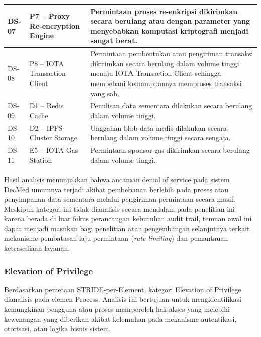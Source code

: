 \begin{xltabular}{\textwidth}{|>{\centering\arraybackslash}p{1.8cm}|>{\raggedright\arraybackslash}p{3.2cm}|X|}
    DS-07 &
    P7 -- Proxy Re-encryption Engine &
    Permintaan proses re-enkripsi dikirimkan secara berulang atau dengan parameter yang menyebabkan komputasi kriptografi menjadi sangat berat. \\
    \hline

    DS-08 &
    P8 -- IOTA Transaction Client &
    Permintaan pembentukan atau pengiriman transaksi dikirimkan secara berulang dalam volume tinggi menuju IOTA Transaction Client sehingga membebani kemampuannya memproses transaksi yang sah. \\
    \hline

    DS-09 &
    D1 -- Redis Cache &
    Penulisan data sementara dilakukan secara berulang dalam volume tinggi. \\
    \hline

    DS-10 &
    D2 -- IPFS Cluster Storage &
    Unggahan blob data medis dilakukan secara berulang dalam volume tinggi secara sengaja. \\
    \hline

    DS-11 &
    E5 -- IOTA Gas Station &
    Permintaan sponsor gas dikirimkan secara berulang dalam volume tinggi. \\
    \hline

\end{xltabular}

Hasil analisis menunjukkan bahwa ancaman denial of service pada sistem DecMed umumnya terjadi akibat pembebanan berlebih pada proses atau penyimpanan data sementara melalui pengiriman permintaan secara masif. Meskipun kategori ini tidak dianalisis secara mendalam pada penelitian ini karena berada di luar fokus perancangan kebutuhan audit trail, temuan awal ini dapat menjadi masukan bagi penelitian atau pengembangan selanjutnya terkait mekanisme pembatasan laju permintaan (\textit{rate limiting}) dan pemantauan ketersediaan layanan.

\subsubsection{Elevation of Privilege}

Berdasarkan pemetaan STRIDE-per-Element, kategori Elevation of Privilege dianalisis pada elemen Process. Analisis ini bertujuan untuk mengidentifikasi kemungkinan pengguna atau proses memperoleh hak akses yang melebihi kewenangan yang diberikan akibat kelemahan pada mekanisme autentikasi, otorisasi, atau logika bisnis sistem.

